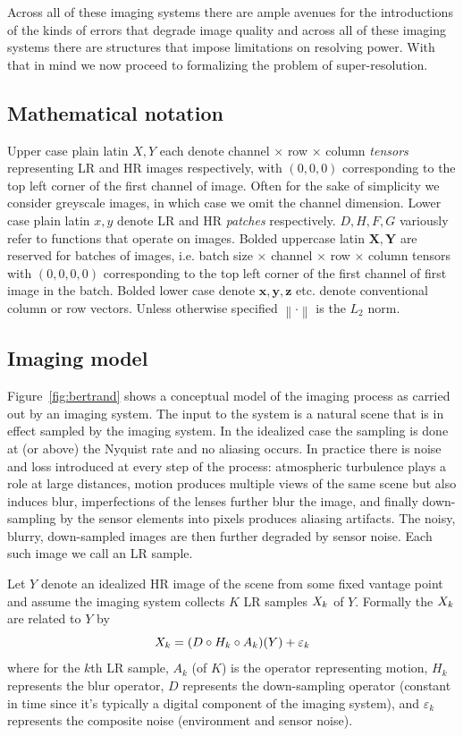 Across all of these imaging systems there are ample avenues for the introductions of the kinds of errors that degrade image quality and across all of these imaging systems there are structures that impose limitations on resolving power.
%
With that in mind we now proceed to formalizing the problem of super-resolution.

\subsection{Mathematical notation}\label{subsec:notation}
Upper case plain latin $X, Y$ each denote channel $\times$ row $\times$ column \textit{tensors} representing LR and HR images respectively, with $(0, 0,0)$ corresponding to the top left corner of the first channel of image.
%
Often for the sake of simplicity we consider greyscale images, in which case we omit the channel dimension.
%
Lower case plain latin $x, y$ denote LR and HR \textit{patches} respectively.
%
$D, H, F, G$ variously refer to functions that operate on images.
%
Bolded uppercase latin $\bm{X}, \bm{Y}$ are reserved for batches of images, i.e. batch size $\times$ channel $\times$ row $\times$ column tensors with $(0, 0, 0,0)$ corresponding to the top left corner of the first channel of first image in the batch.
%
Bolded lower case denote $\bm{x}, \bm{y}, \bm{z}$ etc. denote conventional column or row vectors.
%
Unless otherwise specified $\left\| \cdot \right\|$ is the $L_2$ norm.

\subsection{Imaging model}\label{subsec:imaging-model}

Figure~\ref{fig:bertrand} shows a conceptual model of the imaging process as carried out by an imaging system.
%
The input to the system is a natural scene that is in effect sampled by the imaging system.
%
In the idealized case the sampling is done at (or above) the Nyquist rate and no aliasing occurs.
%
In practice there is noise and loss introduced at every step of the process: atmospheric turbulence plays a role at large distances, motion produces multiple views of the same scene but also induces blur, imperfections of the lenses further blur the image, and finally down-sampling by the sensor elements into pixels produces aliasing artifacts.
%
The noisy, blurry, down-sampled images are then further degraded by sensor noise.
%
Each such image we call an LR sample.

Let $Y$ denote an idealized HR image of the scene from some fixed vantage point and assume the imaging system collects $K$ LR samples $X_k$ of $Y$.
%
Formally the $X_k$ are related to $Y$ by
\begin{equation}
	X_k = (D \circ H_k \circ A_k) (Y) + \varepsilon_k
	\label{eqn:imagingmodel}
\end{equation}
where for the $k$th LR sample, $A_k$ (of $K$) is the operator representing motion, $H_k$ represents the blur operator, $D$ represents the down-sampling operator (constant in time since it's typically a digital component of the imaging system), and $\varepsilon_k$ represents the composite noise (environment and sensor noise).

